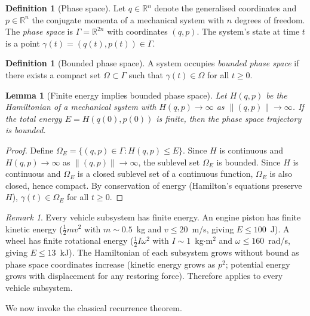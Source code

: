 \documentclass[twocolumn,10pt,a4paper]{article}
\newtheorem{lemma}[theorem]{Lemma}
\theoremstyle{definition}
\newtheorem{definition}[theorem]{Definition}
\theoremstyle{remark}
\newtheorem{remark}[theorem]{Remark}
\newcommand{\R}{\mathbb{R}}
\begin{document}
\begin{definition}[Phase space]\label{def:phase_space}
Let $q \in \R^n$ denote the generalised coordinates and $p \in \R^n$ the conjugate momenta of a mechanical system with $n$ degrees of freedom. The \emph{phase space} is $\Gamma = \R^{2n}$ with coordinates $(q, p)$. The system's state at time $t$ is a point $\gamma(t) = (q(t), p(t)) \in \Gamma$.
\end{definition}

\begin{definition}[Bounded phase space]\label{def:bounded}
A system occupies \emph{bounded phase space} if there exists a compact set $\Omega \subset \Gamma$ such that $\gamma(t) \in \Omega$ for all $t \geq 0$.
\end{definition}

\begin{lemma}[Finite energy implies bounded phase space]\label{lem:finite_bounded}
Let $H(q,p)$ be the Hamiltonian of a mechanical system with $H(q,p) \to \infty$ as $\|(q,p)\| \to \infty$. If the total energy $E = H(q(0), p(0))$ is finite, then the phase space trajectory is bounded.
\end{lemma}

\begin{proof}
Define $\Omega_E = \{(q,p) \in \Gamma : H(q,p) \leq E\}$. Since $H$ is continuous and $H(q,p) \to \infty$ as $\|(q,p)\| \to \infty$, the sublevel set $\Omega_E$ is bounded. Since $H$ is continuous and $\Omega_E$ is a closed sublevel set of a continuous function, $\Omega_E$ is also closed, hence compact. By conservation of energy (Hamilton's equations preserve $H$), $\gamma(t) \in \Omega_E$ for all $t \geq 0$.
\end{proof}

\begin{remark}\label{rem:vehicle_finite}
Every vehicle subsystem has finite energy. An engine piston has finite kinetic energy ($\frac{1}{2}mv^2$ with $m \sim 0.5$~kg and $v \leq 20$~m/s, giving $E \leq 100$~J). A wheel has finite rotational energy ($\frac{1}{2}I\omega^2$ with $I \sim 1$~kg$\cdot$m$^2$ and $\omega \leq 160$~rad/s, giving $E \leq 13$~kJ). The Hamiltonian of each subsystem grows without bound as phase space coordinates increase (kinetic energy grows as $p^2$; potential energy grows with displacement for any restoring force). Therefore  applies to every vehicle subsystem.
\end{remark}

We now invoke the classical recurrence theorem.
\end{document}
